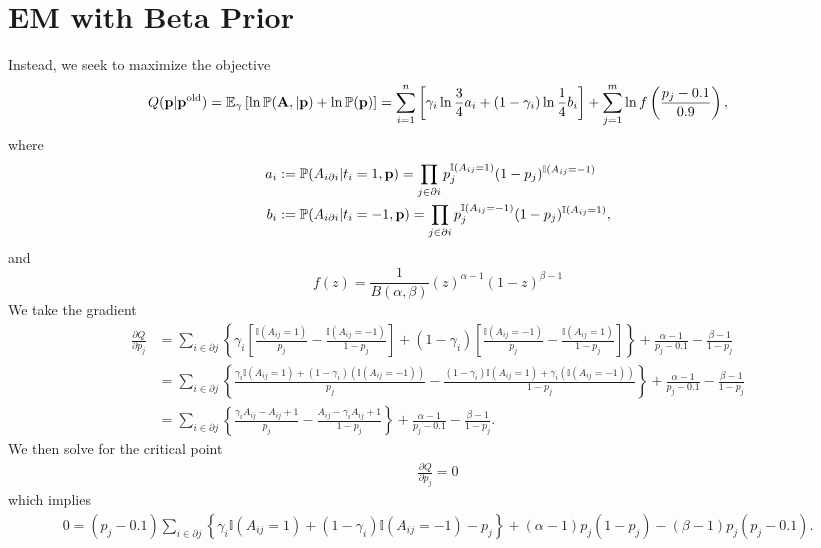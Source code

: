 \documentclass[12pt,onecolumn,letterpaper]{article}
\begin{document}
\section*{EM with Beta Prior}

Instead, we seek to maximize the objective 
\begin{equation*}
   Q({\bf p}|{\bf p}^{\rm old})=\mathbb{E}_{\gamma}\left[\ln\mathbb{P}(\bf{A},|\bf{p})+\ln\mathbb{P({\bf p})}\right]=\sum_{i=1}^n \left[\gamma_i\ln{\frac{3}{4}a_i+(1-\gamma_i)\ln\frac{1}{4}b_i}\right]+\sum_{j=1}^m\ln f\left(\frac{p_j-0.1}{0.9}\right),
\end{equation*}
where 
\begin{align*}
a_i&:=\mathbb{P}(A_{i\partial i}|t_i=1,{\bf p})=\prod_{j\in\partial i} p_j^{\mathbb{I}(A_{ij}=1)}(1-p_j)^{\mathbb{I}(A_{ij}=-1)}\\
b_i&:=\mathbb{P}(A_{i\partial i}|t_i=-1,{\bf p})=\prod_{j\in\partial i} p_j^{\mathbb{I}(A_{ij}=-1)}(1-p_j)^{\mathbb{I}(A_{ij}=1)},
\end{align*}
and
\begin{equation*}
 f(z)=\frac{1}{B(\alpha,\beta)}(z)^{\alpha-1}(1-z)^{\beta-1}
\end{equation*}
We take the gradient
\begin{align*}
   \frac{\partial{Q}}{\partial{p_j}}&=\sum_{i\in\partial j}\left\{\gamma_i\left[\frac{\mathbb{I}(A_{ij}=1)}{p_j}-\frac{\mathbb{I}(A_{ij}=-1)}{1-p_j}\right]+(1-\gamma_i)\left[\frac{\mathbb{I}(A_{ij}=-1)}{p_j}-\frac{\mathbb{I}(A_{ij}=1)}{1-p_j}\right]\right\}+\frac{\alpha-1}{p_j-0.1}-\frac{\beta-1}{1-p_j}\\
   &=\sum_{i\in\partial j}\left\{\frac{\gamma_i\mathbb{I}(A_{ij}=1)+(1-\gamma_i)(\mathbb{I}(A_{ij}=-1))}{p_j}-\frac{(1-\gamma_i)\mathbb{I}(A_{ij}=1)+\gamma_i(\mathbb{I}(A_{ij}=-1))}{1-p_j}\right\}+\frac{\alpha-1}{p_j-0.1}-\frac{\beta-1}{1-p_j}\\
   &=\sum_{i\in\partial j}\left\{\frac{\gamma_iA_{ij}-A_{ij}+1}{p_j}-\frac{A_{ij}-\gamma_iA_{ij}+1}{1-p_j}\right\}+\frac{\alpha-1}{p_j-0.1}-\frac{\beta-1}{1-p_j}.
\end{align*}
We then solve for the critical point
\begin{align*}
\frac{\partial{Q}}{\partial{p_j}}=0
\end{align*}
which implies
\begin{align*}
  0=(p_j-0.1)\sum_{i\in\partial j}\left\{\gamma_i\mathbb{I}(A_{ij}=1)+(1-\gamma_i)\mathbb{I}(A_{ij}=-1)-p_j\right\}+(\alpha-1)p_j(1-p_j)-(\beta-1)p_j(p_j-0.1).
\end{align*}
\end{document}

